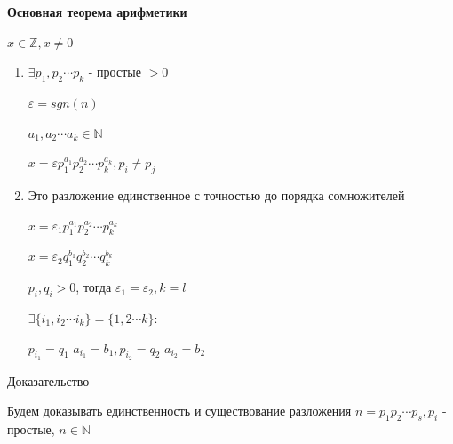 \documentclass[14pt, letter paper]{article}
\begin{document}
\textbf{Основная теорема арифметики}

$x \in \mathbb{Z}, x \neq 0$

\begin{enumerate}
    \item $\exists p_1, p_2 \cdots p_k$ - простые $> 0$

    $\varepsilon = sgn(n)$

    $a_1, a_2 \cdots a_k \in \mathbb{N}$

    $x = \varepsilon p_1^{a_1} p_2^{a_2} \cdots p_k^{a_k}, p_i \neq p_j$

    \item Это разложение единственное с точностью до порядка сомножителей

    $x = \varepsilon_1 p_1^{a_1} p_2^{a_2} \cdots p_k^{a_k}$

    $x = \varepsilon_2 q_1^{b_1} q_2^{b_2} \cdots q_k^{b_k}$

    $p_i, q_i > 0$, тогда $\varepsilon_1 = \varepsilon_2, k = l$

    $\exists \{i_1, i_2 \cdots i_k\} = \{1, 2 \cdots k\}:$

    $p_{i_1} = q_1$ $a_{i_1} = b_1, p_{i_2} = q_2$ $a_{i_2} = b_2$
\end{enumerate}

\begin{center}
    Доказательство
\end{center}

Будем доказывать единственность и существование разложения $n = p_1 p_2 \cdots p_s, p_i$ - простые, $n \in \mathbb{N}$
\end{document}
